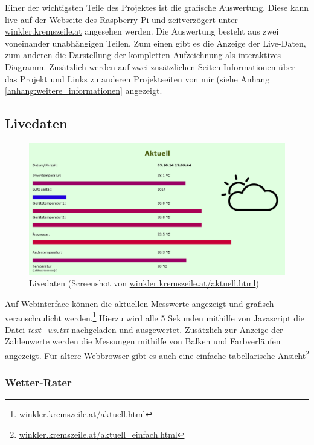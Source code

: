 Einer der wichtigsten Teile des Projektes ist die grafische Auswertung. Diese kann live auf der Webseite des Raspberry Pi und zeitverzögert unter \href{http://winkler.kremszeile.at}{winkler.kremszeile.at} angesehen werden. Die Auswertung besteht aus zwei voneinander unabhängigen Teilen. Zum einen gibt es die Anzeige der Live-Daten, zum anderen die Darstellung der kompletten Aufzeichnung als interaktives Diagramm. Zusätzlich werden auf zwei zusätzlichen Seiten Informationen über das Projekt und Links zu anderen Projektseiten von mir (siehe Anhang \ref{anhang:weitere_informationen} angezeigt.

\subsection{Livedaten}
\label{subsec:Livedaten}

\begin{figure}[h]
  \centering
     \includegraphics[width=\textwidth]{figures/aktuell.png}
  \caption{Livedaten (Screenshot von \href{http://winkler.kremszeile.at/aktuell.html}{winkler.kremszeile.at/aktuell.html})}
  \label{fig:livedaten}
\end{figure}

Auf Webinterface können die aktuellen Messwerte angezeigt und grafisch veranschaulicht werden.\footnote{\href{http://winkler.kremszeile.at/aktuell.html}{winkler.kremszeile.at/aktuell.html}}
Hierzu wird alle 5 Sekunden mithilfe von \gls{Javascript} die Datei \emph{text\_ws.txt} nachgeladen und ausgewertet. Zusätzlich zur Anzeige der Zahlenwerte werden die Messungen mithilfe von Balken und Farbverläufen angezeigt. Für ältere Webbrowser gibt es auch eine einfache tabellarische Ansicht\footnote{\href{http://winkler.kremszeile.at/aktuell_einfach.html}{winkler.kremszeile.at/aktuell\_einfach.html}}

\subsubsection{Wetter-Rater}
\label{subsubsec:Wetterrater}

